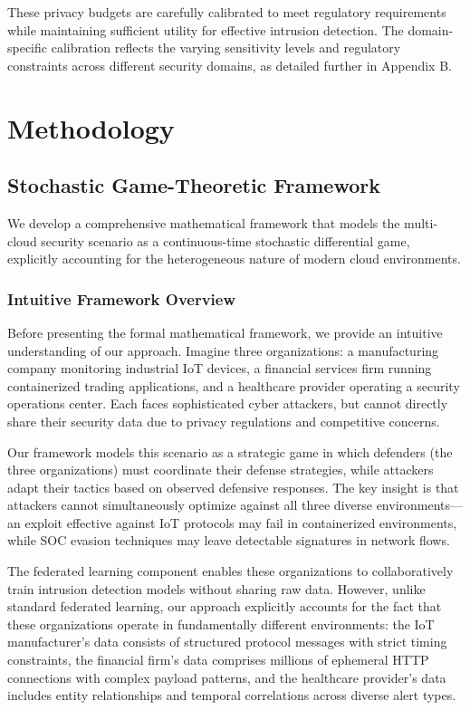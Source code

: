 \documentclass[12pt,a4paper]{article}
\theoremstyle{definition}
\begin{document}
These privacy budgets are carefully calibrated to meet regulatory requirements while maintaining sufficient utility for effective intrusion detection. The domain-specific calibration reflects the varying sensitivity levels and regulatory constraints across different security domains, as detailed further in Appendix B.

\section{Methodology}

\subsection{Stochastic Game-Theoretic Framework}

We develop a comprehensive mathematical framework that models the multi-cloud security scenario as a continuous-time stochastic differential game, explicitly accounting for the heterogeneous nature of modern cloud environments.

\subsubsection{Intuitive Framework Overview}

Before presenting the formal mathematical framework, we provide an intuitive understanding of our approach. Imagine three organizations: a manufacturing company monitoring industrial IoT devices, a financial services firm running containerized trading applications, and a healthcare provider operating a security operations center. Each faces sophisticated cyber attackers, but cannot directly share their security data due to privacy regulations and competitive concerns.

Our framework models this scenario as a strategic game in which defenders (the three organizations) must coordinate their defense strategies, while attackers adapt their tactics based on observed defensive responses. The key insight is that attackers cannot simultaneously optimize against all three diverse environments—an exploit effective against IoT protocols may fail in containerized environments, while SOC evasion techniques may leave detectable signatures in network flows.

The federated learning component enables these organizations to collaboratively train intrusion detection models without sharing raw data. However, unlike standard federated learning, our approach explicitly accounts for the fact that these organizations operate in fundamentally different environments: the IoT manufacturer's data consists of structured protocol messages with strict timing constraints, the financial firm's data comprises millions of ephemeral HTTP connections with complex payload patterns, and the healthcare provider's data includes entity relationships and temporal correlations across diverse alert types.
\end{document}

